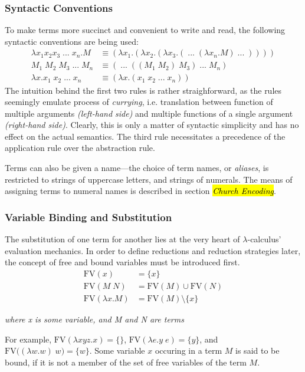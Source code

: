 \documentclass[a4paper,10pt]{article}
\begin{document}
\subsubsection{Syntactic Conventions}
To make terms more succinct and convenient to write and read, the 
following syntactic conventions are being used:
\begin{align*}
	\lambda x_1 x_2 x_3\;...\;x_n.M &\equiv (\lambda x_1.(\lambda x_2.(\lambda x_3.(\;...\;(\lambda x_n.M)\;...\;))))\\
	M_1\;M_2\;M_3\;...\;M_n &\equiv (\;...\;((M_1\;M_2)\;M_3)\;...\;M_n)\\
	\lambda x.x_1\;x_2\;...\;x_n &\equiv (\lambda x.(x_1\;x_2\;...\;x_n))
\end{align*}
The intuition behind the first two rules is rather straighforward, as the rules
seemingly emulate process of \textit{currying}, i.e.
translation between function of multiple arguments \textit{(left-hand side)} and multiple
functions of a single argument \textit{(right-hand side)}. Clearly, this is only
a matter of syntactic simplicity and has no effect on the actual semantics.
The third rule necessitates a precedence of the application rule over the abstraction rule.

Terms can also be given a name---the choice of term names, or \textit{aliases}, is restricted to 
strings of uppercase letters, and strings of numerals.
The means of assigning terms to numeral names is described in section \hl{\textit{Church Encoding}}.

\subsubsection{Variable Binding and Substitution}
The substitution of one term for another lies at the very heart of $\lambda$-calculus'
evaluation mechanics. In order to define reductions and reduction strategies
later, the concept of free and bound variables must be introduced first.
\begin{align*}
	\mathrm{FV}(x) &= \{x\} \\
    \mathrm{FV}(M\;N) &= \mathrm{FV}(M) \cup \mathrm{FV}(N) \\
	\mathrm{FV}(\lambda x.M) &= \mathrm{FV}(M) \setminus \{x\}
\end{align*}
\begin{center}
\textit{where x is some variable, and M and N are terms}
\end{center}
For example, $\mathrm{FV}(\lambda x y z.x) = \{\}$, $\mathrm{FV}(\lambda e.y\;e) = \{y\}$,
and $\mathrm{FV}\big((\lambda w.w)\;w\big) = \{w\}$. Some variable $x$ occuring in a term $M$ is
said to be bound, if it is not a member of the set of free variables of the term $M$.
\end{document}
